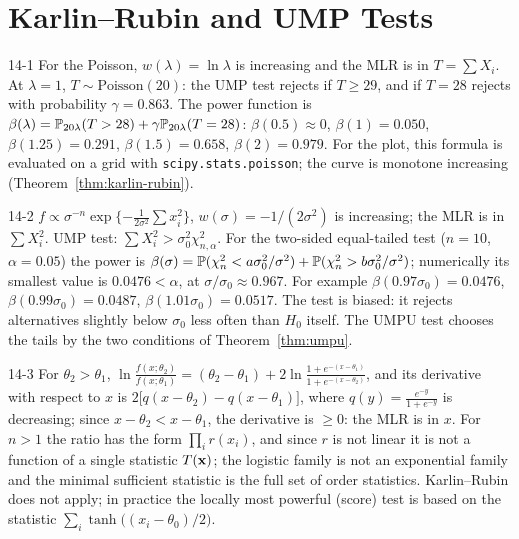 \section{Karlin--Rubin and UMP Tests}

\begin{solution}{14-1}
For the Poisson, $w(\lambda)=\ln\lambda$ is increasing and the MLR is in $T=\sum X_i$. At $\lambda=1$, $T\sim\text{Poisson}(20)$: the UMP test rejects if $T\ge29$, and if $T=28$ rejects with probability $\gamma=0.863$. The power function is $\beta(\lambda)=\P_{20\lambda}(T>28)+\gamma\P_{20\lambda}(T=28)$:
$\beta(0.5)\approx0$, $\beta(1)=0.050$, $\beta(1.25)=0.291$, $\beta(1.5)=0.658$, $\beta(2)=0.979$. For the plot, this formula is evaluated on a grid with \texttt{scipy.stats.poisson}; the curve is monotone increasing (Theorem~\ref{thm:karlin-rubin}).
\end{solution}

\begin{solution}{14-2}
$f\propto\sigma^{-n}\exp\{-\frac{1}{2\sigma^2}\sum x_i^2\}$, $w(\sigma)=-1/(2\sigma^2)$ is increasing; the MLR is in $\sum X_i^2$. UMP test: $\sum X_i^2>\sigma_0^2\chi^2_{n,\alpha}$. For the two-sided equal-tailed test ($n=10$, $\alpha=0.05$) the power is $\beta(\sigma)=\P(\chi^2_n<a\sigma_0^2/\sigma^2)+\P(\chi^2_n>b\sigma_0^2/\sigma^2)$; numerically its smallest value is $0.0476<\alpha$, at $\sigma/\sigma_0\approx0.967$. For example $\beta(0.97\sigma_0)=0.0476$, $\beta(0.99\sigma_0)=0.0487$, $\beta(1.01\sigma_0)=0.0517$. The test is biased: it rejects alternatives slightly below $\sigma_0$ less often than $H_0$ itself. The UMPU test chooses the tails by the two conditions of Theorem~\ref{thm:umpu}.
\end{solution}

\begin{solution}{14-3}
For $\theta_2>\theta_1$, $\ln\frac{f(x;\theta_2)}{f(x;\theta_1)}=(\theta_2-\theta_1)+2\ln\frac{1+e^{-(x-\theta_1)}}{1+e^{-(x-\theta_2)}}$, and its derivative with respect to $x$ is $2\big[q(x-\theta_2)-q(x-\theta_1)\big]$, where $q(y)=\frac{e^{-y}}{1+e^{-y}}$ is decreasing; since $x-\theta_2<x-\theta_1$, the derivative is $\ge0$: the MLR is in $x$. For $n>1$ the ratio has the form $\prod_ir(x_i)$, and since $r$ is not linear it is not a function of a single statistic $T(\x)$; the logistic family is not an exponential family and the minimal sufficient statistic is the full set of order statistics. Karlin--Rubin does not apply; in practice the locally most powerful (score) test is based on the statistic $\sum_i\tanh\big((x_i-\theta_0)/2\big)$.
\end{solution}


